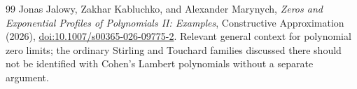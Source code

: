 \begin{thebibliography}{99}
Jonas Jalowy, Zakhar Kabluchko, and Alexander Marynych,
\emph{Zeros and Exponential Profiles of Polynomials II: Examples},
Constructive Approximation (2026),
\href{https://doi.org/10.1007/s00365-026-09775-2}{doi:10.1007/s00365-026-09775-2}.
Relevant general context for polynomial zero limits; the ordinary
Stirling and Touchard families discussed there should not be identified
with Cohen's Lambert polynomials without a separate argument.

\end{thebibliography}

